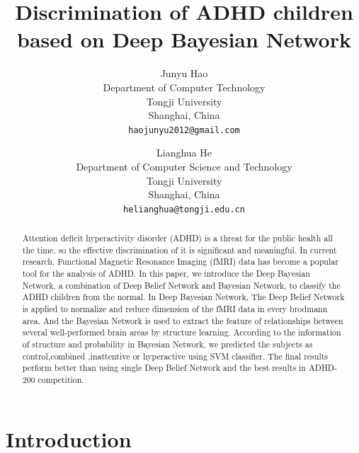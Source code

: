 \documentclass[10pt,twocolumn,letterpaper]{article}
\begin{document}
\title{Discrimination of ADHD children based on Deep Bayesian Network}

\author{Junyu Hao\\
Department of Computer Technology\\
Tongji University\\
Shanghai, China\\
{\tt\small haojunyu2012@gmail.com}
\and
Lianghua He\\
Department of Computer Science and Technology\\
Tongji University\\
Shanghai, China\\
{\tt\small helianghua@tongji.edu.cn}
}

\maketitle

\begin{abstract}
Attention deficit hyperactivity disorder (ADHD) is a threat for the public health all the time, so the effective discrimination of it is significant and meaningful. In current research, Functional Magnetic Resonance Imaging (fMRI) data has become a popular tool for the analysis of ADHD. In this paper, we introduce the Deep Bayesian Network, a combination of Deep Belief Network and Bayesian Network, to classify the ADHD children from the normal. In Deep Bayesian Network, The Deep Belief Network is applied to  normalize and reduce dimension of the fMRI data in every brodmann area. And the Bayesian Network is used to extract the feature of relationships between several well-performed brain areas by structure learning. According to the information of structure and probability in Bayesian Network, we predicted the subjects as control,combined ,inattentive or hyperactive using SVM classifier. The final results perform better than using single Deep Belief Network and the best results in ADHD-200 competition. 
\end{abstract}



\section{Introduction}
\end{document}
